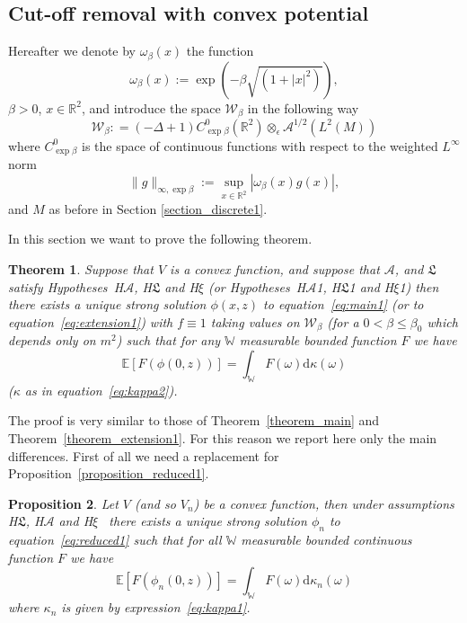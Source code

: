 \documentclass[a4paper,10pt]{article}
\newcommand{\assign}{:=}
\newcommand{\mathd}{\mathrm{d}}
\newtheorem{theorem}{Theorem}
\newtheorem{proposition}[theorem]{Proposition}
{\theorembodyfont{\rmfamily}\newtheorem{remark}[theorem]{Remark}}
\begin{document}
\subsection{Cut-off removal with convex
potential}\label{subsection_extension2}

Hereafter we denote by $\omega_{\beta} (x)$ the function
\begin{equation}
  \omega_{\beta} (x) \assign \exp (- \beta \sqrt{(1 + | x |^2)}),
  \label{eq:exponentialweight}
\end{equation}
$\beta > 0$, $x \in \mathbb{R}^2$, and introduce the space
$\mathcal{W}_{\beta}$ in the following way
\[ \mathcal{W}_{\beta} : = (- \Delta + 1) C^0_{\exp \beta} (\mathbb{R}^2)
   \otimes_{\epsilon} \mathcal{A}^{1 / 2} (L^2 (M)) \]
where $C^0_{\exp \beta}$ is the space of continuous functions with respect to
the weighted $L^{\infty}$ norm
\[ \| g \|_{\infty, \exp \beta} \assign \sup_{x \in \mathbb{R}^2} |
   \omega_{\beta} (x) g (x) |, \]
and $M$ as before in Section \ref{section_discrete1}.

In this section we want to prove the following theorem.

\begin{theorem}
  \label{theorem_extension2}Suppose that $V$ is a convex function, and suppose
  that $\mathcal{A}$, and $\mathfrak{L}$ satisfy Hypotheses~H$\mathcal{A}$,
  H$\mathfrak{L}$ and H$\xi$ (or Hypotheses~H$\mathcal{A}$1, H$\mathfrak{L}$1
  and H$\xi$1) then there exists a unique strong solution $\phi (x, z)$ to
  equation~{\eqref{eq:main1}} (or to equation~{\eqref{eq:extension1}}) with $f
  \equiv 1$ taking values on $\mathcal{W}_{\beta}$ (for a $0 < \beta \leqslant
  \beta_0$ which depends only on $m^2$) such that for any $\mathbb{W}$
  measurable bounded function $F$ we have
  \begin{equation}
    \mathbb{E} [F (\phi (0, z))] = \int_{\mathbb{W}} F (\omega) \mathd \kappa
    (\omega) \label{eq:extension4}
  \end{equation}
  ($\kappa$ as in equation~{\eqref{eq:kappa2}}).
\end{theorem}

The proof is very similar to those of Theorem~\ref{theorem_main} and
Theorem~\ref{theorem_extension1}. For this reason we report here only the main
differences. First of all we need a replacement for
Proposition~\ref{proposition_reduced1}.

\begin{proposition}
  \label{proposition_extension1}Let $V$ (and so $V_n$) be a convex function,
  then under assumptions H$\mathfrak{L}$, H$\mathcal{A}$ and H$\xi$ \ there
  exists a unique strong solution $\phi_n$ to equation~{\eqref{eq:reduced1}}
  such that for all $\mathbb{W}$ measurable bounded continuous function $F$ we
  have
  \begin{equation}
    \mathbb{E} [F (\phi_n (0, z))] = \int_{\mathbb{W}} F (\omega) \mathd
    \kappa_n (\omega) \label{eq:reduced9}
  \end{equation}
  where $\kappa_n$ is given by expression~{\eqref{eq:kappa1}}.
\end{proposition}
\end{document}
